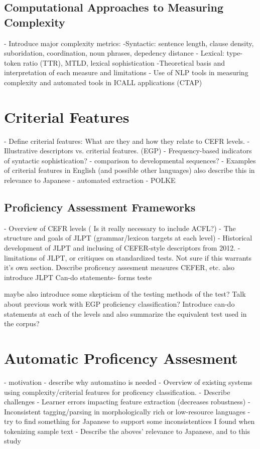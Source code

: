 \subsection{Computational Approaches to Measuring Complexity}
- Introduce major complexity metrics:
    -Syntactic: sentence length, clause density, suboridation, coordination, noun phrases, depedency distance
    - Lexical: type-token ratio (TTR), MTLD, lexical sophistication
-Theoretical basis and interpretation of each measure and limitations
- Use of NLP tools in measuring complexity and automated tools in ICALL applications (CTAP)

\section{Criterial Features}
- Define criterial features: What are they and how they relate to CEFR levels.
- Illustrative descriptors vs. criterial features. (EGP)
- Frequency-based indicators of syntactic sophistication? \cite{Ellis2004}
    - comparison to developmental sequences?
- Examples of criterial features in English (and possible other languages) also describe this in relevance to Japanese
- automated extraction - POLKE


\subsection{Proficiency Assessment Frameworks}
- Overview of CEFR levels ( Is it really necessary to include ACFL?)
- The structure and goals of JLPT (grammar/lexicon targets at each level)
- Historical development of JLPT and inclusing of CEFER-style descriptors from 2012.
- limitations of JLPT, or critiques on standardized tests.
Not sure if this warrants it's own section. Describe proficency assesment measures CEFER, etc. also introduce JLPT
Can-do statements- forms teste


maybe also introduce some skepticism of the testing methods of the test?
Talk about previous work with EGP proficiency classification?
Introduce can-do statements at each of the levels and also summarize the equivalent test used in the corpus?


\section{Automatic Proficency Assesment}
- motivation - describe why automatino is needed
- Overview of existing systems using complexity/criterial features for proficency classification.
- Describe challenges
    - Learner errors impacting feature extraction (decreases robustness)
    -Inconsistent tagging/parsing in morphologically rich or low-resource languages
        -try to find something for Japanese to support some inconsistentices I found when tokenizing sample text
- Describe the aboves' relevance to Japanese, and to this study


